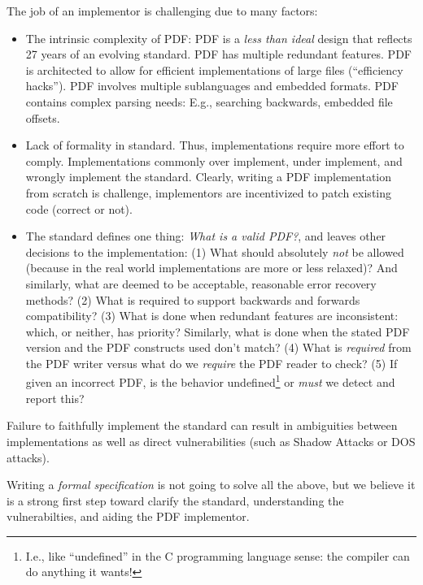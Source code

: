 The job of an implementor is challenging due to many factors:
\begin{itemize}
\item The intrinsic complexity of PDF:
  PDF is a \emph{less than ideal} design that reflects 27 years of
  an evolving standard.
  PDF has multiple redundant features.
  PDF is architected to allow for efficient implementations of
  large files (``efficiency hacks'').
  PDF involves multiple sublanguages and embedded formats.
  PDF contains complex parsing needs:
  E.g., searching backwards, embedded file offsets.
\item Lack of formality in standard. Thus, implementations
  require more effort to comply.
  Implementations commonly over implement, under implement,
  and wrongly implement the standard.
  Clearly, writing a PDF implementation from scratch is challenge,
  implementors are incentivized to patch existing code (correct or not).
\item The standard defines one thing: \emph{What is a valid PDF?},
  and leaves other decisions to the implementation:
  (1) What should absolutely \emph{not} be allowed (because in the real world
    implementations are more or less relaxed)? And similarly,
    what are deemed to be acceptable, reasonable error recovery methods?
  (2) What is required to support backwards and forwards compatibility?
  (3) What is done when redundant features are inconsistent: which, or
    neither, has priority?
    Similarly, what is done when the stated PDF version and the PDF
    constructs used don't match?
  (4) What is \emph{required} from the PDF writer versus
    what do we \emph{require} the PDF reader to check?
  (5) If given an incorrect PDF, is the behavior undefined\footnote{
      I.e., like ``undefined'' in the C programming language sense: the
      compiler can do anything it wants!
    } or \emph{must} we detect and report this?
\end{itemize}
Failure to faithfully implement the standard can result in ambiguities
between implementations as well as direct vulnerabilities (such as
Shadow Attacks or DOS attacks).

Writing a \emph{formal specification} is not going to solve all the above,
but we believe it is a strong first step toward clarify the
standard, understanding the vulnerabilties, and aiding the PDF implementor.

